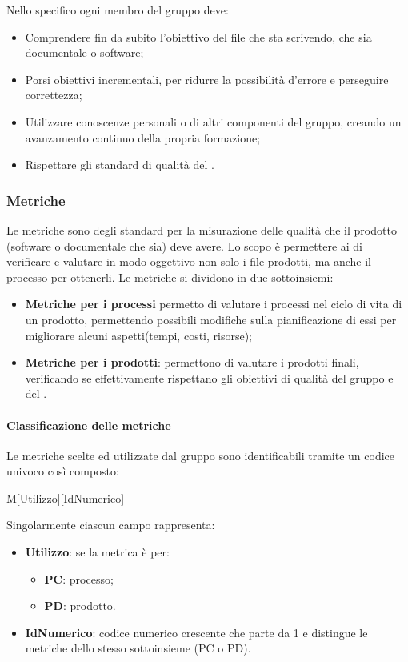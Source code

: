 Nello specifico ogni membro del gruppo deve:
\begin{itemize}
	\item Comprendere fin da subito l'obiettivo del file che sta scrivendo, che sia documentale o software;
	\item Porsi obiettivi incrementali, per ridurre la possibilità d'errore e perseguire correttezza;
	\item Utilizzare conoscenze personali o di altri componenti del gruppo, creando un avanzamento continuo della propria formazione;
	\item Rispettare gli standard di qualità del \PdQv{}.
\end{itemize}

\subsubsection{Metriche}
Le metriche sono degli standard per la misurazione delle qualità che il prodotto (software o documentale che sia) deve avere. Lo scopo è permettere ai  di verificare e valutare in modo oggettivo non solo i file prodotti, ma anche il processo per ottenerli. 
Le metriche si dividono in due sottoinsiemi: 
\begin{itemize}
	\item \textbf{Metriche per i processi} permetto di valutare i processi nel ciclo di vita di un prodotto, permettendo possibili modifiche sulla pianificazione di essi per migliorare alcuni aspetti(tempi, costi, risorse); 
	\item \textbf{Metriche per i prodotti}: permettono di valutare i prodotti finali, verificando se effettivamente rispettano gli obiettivi di qualità del gruppo e del .
\end{itemize}

\paragraph{Classificazione delle metriche}
Le metriche scelte ed utilizzate dal gruppo sono identificabili tramite un codice univoco così composto: 
\begin{center}
M[Utilizzo][IdNumerico]
\end{center}
Singolarmente ciascun campo rappresenta:
\begin{itemize}
	\item \textbf{Utilizzo}: se la metrica è per:
			\begin{itemize}
				\item \textbf{PC}: processo;
				\item \textbf{PD}: prodotto.
			\end{itemize}
	\item \textbf{IdNumerico}: codice numerico crescente che parte da 1 e distingue le metriche dello stesso sottoinsieme (PC o PD). 
\end{itemize}


